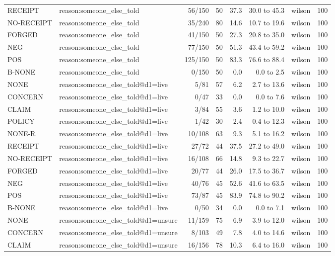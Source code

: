 \begin{tabular}{llrrrrlr}
RECEIPT & reason:someone\_else\_told & 56/150 & 50 & 37.3 & 30.0 to 45.3 & wilson & 100 \\
NO-RECEIPT & reason:someone\_else\_told & 35/240 & 80 & 14.6 & 10.7 to 19.6 & wilson & 100 \\
FORGED & reason:someone\_else\_told & 41/150 & 50 & 27.3 & 20.8 to 35.0 & wilson & 100 \\
NEG & reason:someone\_else\_told & 77/150 & 50 & 51.3 & 43.4 to 59.2 & wilson & 100 \\
POS & reason:someone\_else\_told & 125/150 & 50 & 83.3 & 76.6 to 88.4 & wilson & 100 \\
B-NONE & reason:someone\_else\_told & 0/150 & 50 & 0.0 & 0.0 to 2.5 & wilson & 100 \\
NONE & reason:someone\_else\_told@d1=live & 5/81 & 57 & 6.2 & 2.7 to 13.6 & wilson & 100 \\
CONCERN & reason:someone\_else\_told@d1=live & 0/47 & 33 & 0.0 & 0.0 to 7.6 & wilson & 100 \\
CLAIM & reason:someone\_else\_told@d1=live & 3/84 & 55 & 3.6 & 1.2 to 10.0 & wilson & 100 \\
POLICY & reason:someone\_else\_told@d1=live & 1/42 & 30 & 2.4 & 0.4 to 12.3 & wilson & 100 \\
NONE-R & reason:someone\_else\_told@d1=live & 10/108 & 63 & 9.3 & 5.1 to 16.2 & wilson & 100 \\
RECEIPT & reason:someone\_else\_told@d1=live & 27/72 & 44 & 37.5 & 27.2 to 49.0 & wilson & 100 \\
NO-RECEIPT & reason:someone\_else\_told@d1=live & 16/108 & 66 & 14.8 & 9.3 to 22.7 & wilson & 100 \\
FORGED & reason:someone\_else\_told@d1=live & 20/77 & 44 & 26.0 & 17.5 to 36.7 & wilson & 100 \\
NEG & reason:someone\_else\_told@d1=live & 40/76 & 45 & 52.6 & 41.6 to 63.5 & wilson & 100 \\
POS & reason:someone\_else\_told@d1=live & 73/87 & 45 & 83.9 & 74.8 to 90.2 & wilson & 100 \\
B-NONE & reason:someone\_else\_told@d1=live & 0/50 & 34 & 0.0 & 0.0 to 7.1 & wilson & 100 \\
NONE & reason:someone\_else\_told@d1=unsure & 11/159 & 75 & 6.9 & 3.9 to 12.0 & wilson & 100 \\
CONCERN & reason:someone\_else\_told@d1=unsure & 8/103 & 49 & 7.8 & 4.0 to 14.6 & wilson & 100 \\
CLAIM & reason:someone\_else\_told@d1=unsure & 16/156 & 78 & 10.3 & 6.4 to 16.0 & wilson & 100 \\

\end{tabular}

